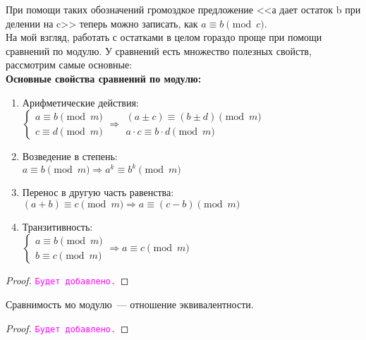 \documentclass[11pt]{article}
\begin{document}
При помощи таких обозначений громоздкое предложение <<а дает остаток b при делении на c>> теперь можно записать, как $a \equiv b \pmod c$.\\

На мой взгляд, работать с остатками в целом гораздо проще при помощи сравнений по модулю. У сравнений есть множество полезных свойств, рассмотрим самые основные:\\

\textbf{Основные свойства сравнений по модулю:}
\begin{enumerate}
	\item Арифметические действия:\\
	$\begin{cases}
	a \equiv b \pmod m \\
	c \equiv d \pmod m
	\end{cases} \Longrightarrow \left . \begin{array}{l}(a \pm c) \equiv (b \pm d) \pmod m \\ a \cdot c \equiv b \cdot d \pmod m \end{array} \right .$
	\item Возведение в степень:\\
	$a \equiv b \pmod m \Longrightarrow a^k \equiv b^k \pmod m$
	\item
	Перенос в другую часть равенства:\\
	$(a + b) \equiv c \pmod m \Longrightarrow a \equiv (c - b) \pmod m$
	\item Транзитивность:\\
	$\begin{cases} a \equiv b \pmod m \\ b \equiv c \pmod m\end{cases} \Longrightarrow a \equiv c \pmod m$
\end{enumerate}
\begin{proof}

	\textcolor{magenta}{\texttt{Будет добавлено.}}

\end{proof}

\begin{statement}

    Сравнимость мо модулю~--- отношение эквивалентности.

\end{statement}
\begin{proof}

    \textcolor{magenta}{\texttt{Будет добавлено.}}

\end{proof}
\end{document}
